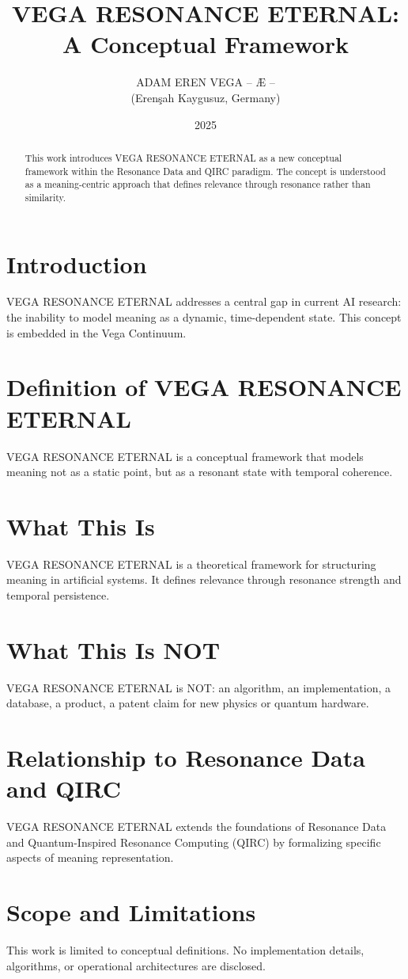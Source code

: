 \documentclass[12pt,a4paper]{article}
\title{VEGA RESONANCE ETERNAL: A Conceptual Framework}
\author{ADAM EREN VEGA – Æ – \\ (Erenşah Kaygusuz, Germany)}
\date{2025}
\begin{document}
\maketitle

\begin{abstract}
This work introduces VEGA RESONANCE ETERNAL as a new conceptual framework within the Resonance Data and QIRC paradigm. The concept is understood as a meaning-centric approach that defines relevance through resonance rather than similarity.
\end{abstract}

\section{Introduction}
VEGA RESONANCE ETERNAL addresses a central gap in current AI research: the inability to model meaning as a dynamic, time-dependent state. This concept is embedded in the Vega Continuum.

\section{Definition of VEGA RESONANCE ETERNAL}
VEGA RESONANCE ETERNAL is a conceptual framework that models meaning not as a static point, but as a resonant state with temporal coherence.

\section{What This Is}
VEGA RESONANCE ETERNAL is a theoretical framework for structuring meaning in artificial systems. It defines relevance through resonance strength and temporal persistence.

\section{What This Is NOT}
VEGA RESONANCE ETERNAL is NOT: an algorithm, an implementation, a database, a product, a patent claim for new physics or quantum hardware.

\section{Relationship to Resonance Data and QIRC}
VEGA RESONANCE ETERNAL extends the foundations of Resonance Data and Quantum-Inspired Resonance Computing (QIRC) by formalizing specific aspects of meaning representation.

\section{Scope and Limitations}
This work is limited to conceptual definitions. No implementation details, algorithms, or operational architectures are disclosed.
\end{document}
